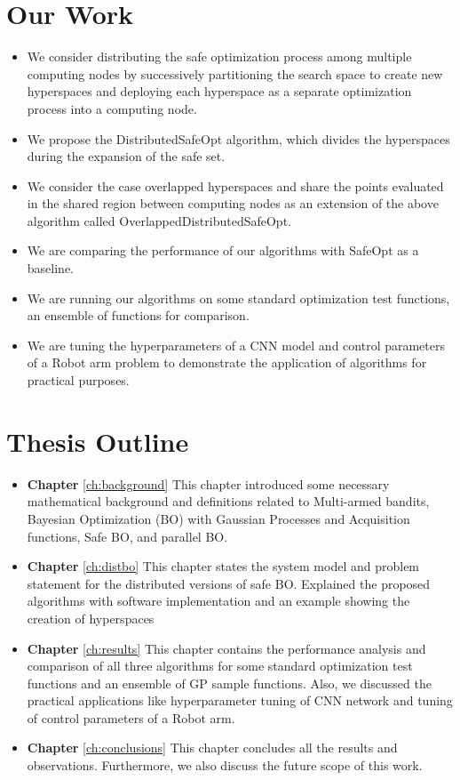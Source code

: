 \section{Our Work}
\label{sec:our-contribution}
\begin{itemize}
	\item We consider distributing the safe optimization process among multiple computing nodes by successively partitioning the search space to create new hyperspaces and deploying each hyperspace as a separate optimization process into a computing node.
	\item We propose the DistributedSafeOpt algorithm, which divides the hyperspaces during the expansion of the safe set.
	\item We consider the case overlapped hyperspaces and share the points evaluated in the shared region between computing nodes as an extension of the above algorithm called OverlappedDistributedSafeOpt.
	\item We are comparing the performance of our algorithms with SafeOpt as a baseline.
	\item We are running our algorithms on some standard optimization test functions, an ensemble of functions for comparison.
	\item We are tuning the hyperparameters of a CNN model and control parameters of a Robot arm problem to demonstrate the application of algorithms for practical purposes.
\end{itemize}


\section{Thesis Outline}
\begin{itemize}
	\item \textbf{Chapter } \ref{ch:background} This chapter introduced some necessary mathematical background and definitions related to Multi-armed bandits, Bayesian Optimization (BO) with Gaussian Processes and Acquisition functions, Safe BO, and parallel BO.
	\item \textbf{Chapter } \ref{ch:distbo} This chapter states the system model and problem statement for the distributed versions of safe BO. Explained the proposed algorithms with software implementation and an example showing the creation of hyperspaces
	\item \textbf{Chapter } \ref{ch:results} This chapter contains the performance analysis and comparison of all three algorithms for some standard optimization test functions and an ensemble of GP sample functions. Also, we discussed the practical applications like hyperparameter tuning of CNN network and tuning of control parameters of a Robot arm.
	\item \textbf{Chapter } \ref{ch:conclusions} This chapter concludes all the results and observations. Furthermore, we also discuss the future scope of this work.
\end{itemize}
